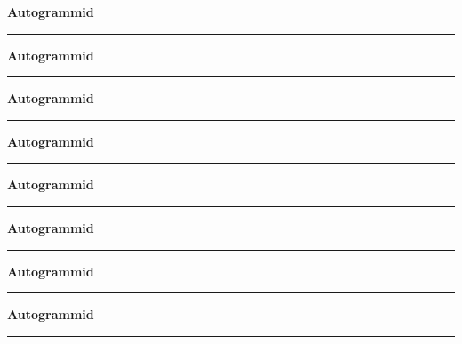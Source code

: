 \null
\cleardoublepage
{\samepage\raggedbottom
\raggedright
\sloppy
\centerline{ {\bf {\large Autogrammid}}}
\vspace{0.1in}
\hrule height 0.05ex}
\null
\clearpage
{\samepage\raggedbottom
\raggedright
\sloppy
\centerline{ {\bf {\large Autogrammid}}}
\vspace{0.1in}
\hrule height 0.05ex}
\null
\clearpage
{\samepage\raggedbottom
\raggedright
\sloppy
\centerline{ {\bf {\large Autogrammid}}}
\vspace{0.1in}
\hrule height 0.05ex}
\null
\clearpage
{\samepage\raggedbottom
\raggedright
\sloppy
\centerline{ {\bf {\large Autogrammid}}}
\vspace{0.1in}
\hrule height 0.05ex}
\null
\clearpage
{\samepage\raggedbottom
\raggedright
\sloppy
\centerline{ {\bf {\large Autogrammid}}}
\vspace{0.1in}
\hrule height 0.05ex}
\null
\clearpage
{\samepage\raggedbottom
\raggedright
\sloppy
\centerline{ {\bf {\large Autogrammid}}}
\vspace{0.1in}
\hrule height 0.05ex}
\null
\clearpage
{\samepage\raggedbottom
\raggedright
\sloppy
\centerline{ {\bf {\large Autogrammid}}}
\vspace{0.1in}
\hrule height 0.05ex}
\null
\clearpage
{\samepage\raggedbottom
\raggedright
\sloppy
\centerline{ {\bf {\large Autogrammid}}}
\vspace{0.1in}
\hrule height 0.05ex}

\begin{flushleft}
\printindex
\end{flushleft}



